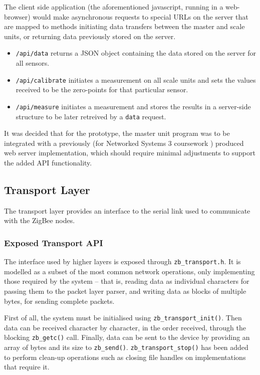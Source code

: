 The client side application (the aforementioned javascript, running in a web-browser) would make asynchronous requests to special URLs on the server that are mapped to methods initiating data transfers between the master and scale units, or returning data previously stored on the server.

\begin{itemize}
	\item \texttt{/api/data} returns a JSON \cite{json-spec} object containing the data stored on the server for all sensors.
	\item \texttt{/api/calibrate} initiates a measurement on all scale units and sets the values received to be the zero-points for that particular sensor.
	\item \texttt{/api/measure} initiates a measurement and stores the results in a server-side structure to be later retreived by a \texttt{data} request.
\end{itemize}

It was decided that for the prototype, the master unit program was to be integrated with a previously (for Networked Systems 3 coursework \cite{ns3-webserver}) produced web server implementation, which should require minimal adjustments to support the added API functionality.

\subsection{Transport Layer}
The transport layer provides an interface to the serial link used to communicate with the ZigBee nodes.

\subsubsection{Exposed Transport API}
The interface used by higher layers is exposed through \texttt{zb\_transport.h}. It is modelled as a subset of the most common network operations, only implementing those required by the system -- that is, reading data as individual characters for passing them to the packet layer parser, and writing data as blocks of multiple bytes, for sending complete packets.

First of all, the system must be initialised using \texttt{zb\_transport\_init()}. Then data can be received character by character, in the order received, through the blocking \texttt{zb\_getc()} call. Finally, data can be sent to the device by providing an array of bytes and its size to \texttt{zb\_send()}. \texttt{zb\_transport\_stop()} has been added to perform clean-up operations such as closing file handles on implementations that require it.


